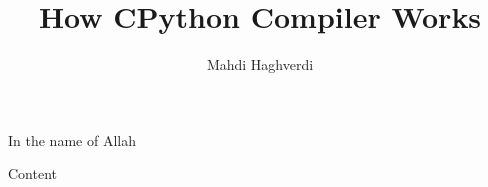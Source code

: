 \documentclass[aspectratio=169, dvipsnames, svgnames, x11names]{beamer}
\title{How CPython Compiler Works}
\author{Mahdi Haghverdi}
\institute{
\\\texttt{[image: logos/logo]}\\
Isfahan University
}
\date{}
\begin{document}
    
\begin{frame}[plain]
\begin{center}
In the name of Allah
\end{center}
\maketitle
\end{frame}

\setcounter{framenumber}{0}
\raggedleft

\begin{frame}{Content}
\begin{flushleft}
\tableofcontents
\end{flushleft}
\end{frame}








\end{document}
